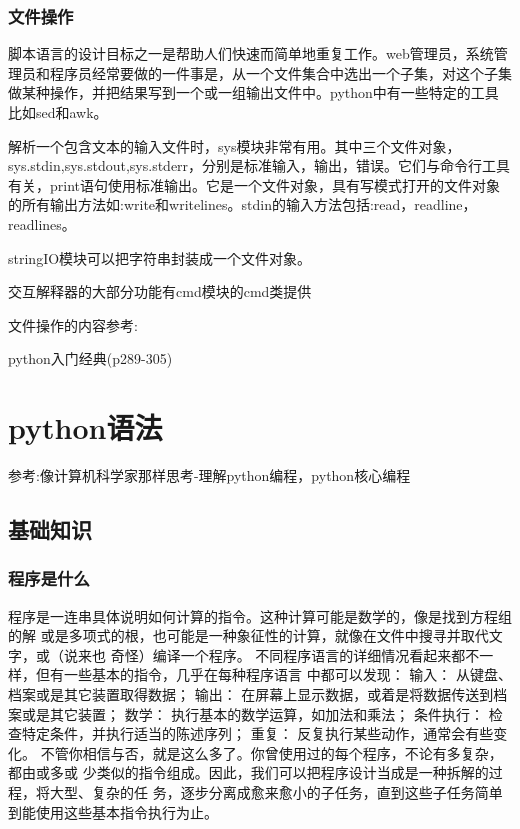 \documentclass[twoside,11pt]{book}
\begin{document}
\subsection{文件操作}
脚本语言的设计目标之一是帮助人们快速而简单地重复工作。web管理员，系统管理员和程序员经常要做的一件事是，从一个文件集合中选出一个子集，对这个子集做某种操作，并把结果写到一个或一组输出文件中。python中有一些特定的工具比如sed和awk。

解析一个包含文本的输入文件时，sys模块非常有用。其中三个文件对象，sys.stdin,sys.stdout,sys.stderr，分别是标准输入，输出，错误。它们与命令行工具有关，print语句使用标准输出。它是一个文件对象，具有写模式打开的文件对象的所有输出方法如:write和writelines。stdin的输入方法包括:read，readline，readlines。

stringIO模块可以把字符串封装成一个文件对象。

交互解释器的大部分功能有cmd模块的cmd类提供

文件操作的内容参考:

python入门经典(p289-305)


\chapter{python语法}

参考:像计算机科学家那样思考-理解python编程，python核心编程

\section{基础知识}

\subsection{程序是什么}
程序是一连串具体说明如何计算的指令。这种计算可能是数学的，像是找到方程组的解
或是多项式的根，也可能是一种象征性的计算，就像在文件中搜寻并取代文字，或（说来也
奇怪）编译一个程序。
不同程序语言的详细情况看起来都不一样，但有一些基本的指令，几乎在每种程序语言
中都可以发现：
输入：
从键盘、档案或是其它装置取得数据；
输出：
在屏幕上显示数据，或着是将数据传送到档案或是其它装置；
数学：
执行基本的数学运算，如加法和乘法；
条件执行：
检查特定条件，并执行适当的陈述序列；
重复：
反复执行某些动作，通常会有些变化。
不管你相信与否，就是这么多了。你曾使用过的每个程序，不论有多复杂，都由或多或
少类似的指令组成。因此，我们可以把程序设计当成是一种拆解的过程，将大型、复杂的任
务，逐步分离成愈来愈小的子任务，直到这些子任务简单到能使用这些基本指令执行为止。
\end{document}
